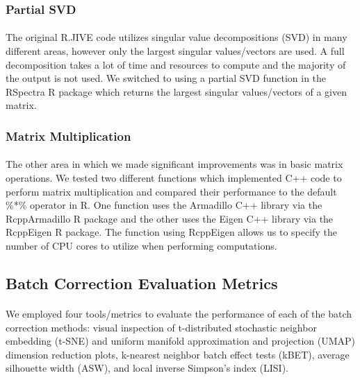\documentclass[
12pt, %
letterpaper, %
oneside, %
headinclude,footinclude, %
BCOR5mm, %
]{scrartcl}
\begin{document}
\subsubsection*{Partial SVD}

\paragraph*{}
The original R.JIVE code utilizes singular value decompositions (SVD) in many different areas, however only the largest singular values/vectors are used. A full decomposition takes a lot of time and resources to compute and the majority of the output is not used. We switched to using a partial SVD function in the RSpectra R package which returns the largest singular values/vectors of a given matrix.

\subsubsection*{Matrix Multiplication}

\paragraph*{}
The other area in which we made significant improvements was in basic matrix operations. We tested two different functions which implemented C++ code to perform matrix multiplication and compared their performance to the default \%*\% operator in R. One function uses the Armadillo C++ library via the RcppArmadillo R package \citep{eddelbuettel2014rcpparmadillo} and the other uses the Eigen C++ library via the RcppEigen R package. The function using RcppEigen allows us to specify the number of CPU cores to utilize when performing computations.


\subsection{Batch Correction Evaluation Metrics}

\paragraph*{}
We employed four tools/metrics to evaluate the performance of each of the batch correction methods: visual inspection of t-distributed stochastic neighbor embedding (t-SNE) and uniform manifold approximation and projection (UMAP) dimension reduction plots, k-nearest neighbor batch effect tests (kBET), average silhouette width (ASW), and local inverse Simpson's index (LISI).
\end{document}
